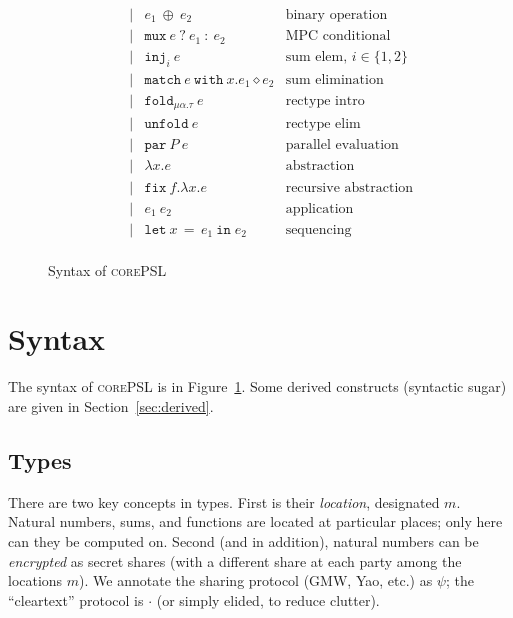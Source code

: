 \documentclass[10pt]{article}
\newcommand{\kw}[1]{\ensuremath{\mathtt{#1}}}
\newcommand{\trec}[2]{\ensuremath{\mu {#1}.{#2}}}
\newcommand{\ebinop}[2]{\ensuremath{{#1}~\oplus~{#2}}}
\newcommand{\elet}[3]{\ensuremath{\kw{let}~#1\, =\, #2~\kw{in}\;{#3}}}
\newcommand{\epar}[2]{\ensuremath{\kw{par}~{#1}~{#2}}}
\newcommand{\econd}[3]{\ensuremath{\kw{match}~{#1}~\kw{with}~x.{#2} \diamond {#3}}}
\newcommand{\emux}[3]{\ensuremath{\kw{mux}~{#1}~\kw{?}~{#2}~\kw{:}~{#3}}}
\newcommand{\einj}[2]{\ensuremath{\kw{inj}_{#1}~{#2}}}
\newcommand{\elam}[2]{\ensuremath{\lambda {#1}.{#2}}}
\newcommand{\eapp}[2]{\ensuremath{{#1}~{#2}}}
\newcommand{\efix}[3]{\ensuremath{\kw{fix}~{#1}.\elam{#2}{#3}}}
\newcommand{\efold}[2]{\ensuremath{\kw{fold}_{#1}~{#2}}}
\newcommand{\eunfold}[1]{\ensuremath{\kw{unfold}~{#1}}}
\newcommand{\lang}{\textsc{corePSL}\xspace}
\begin{document}
\begin{figure}[h]
\[\begin{array}{rlcll}
                       && \mid & \ebinop{e_1}{e_2}  & \text{binary operation} \\
                       && \mid & \emux{e}{e_1}{e_2}  & \text{MPC conditional} \\
                       && \mid & \einj{i}{e} & \text{sum elem, }i \in \{1,2\}\\
                       && \mid & \econd{e}{e_1}{e_2}  & \text{sum elimination} \\
                       && \mid & \efold{\trec{\alpha}{\tau}}{e} & \text{rectype intro}\\
                       && \mid & \eunfold{e} & \text{rectype elim}\\
                       && \mid & \epar{P}{e} & \text{parallel evaluation}\\
                       && \mid & \elam{x}{e}  & \text{abstraction} \\
                       && \mid & \efix{f}{x}{e} & \text{recursive abstraction} \\
                       && \mid & \eapp{e_1}{e_2}  & \text{application} \\
                       && \mid & \elet{x}{e_1}{e_2}  & \text{sequencing} \\
  \end{array}
  \]
  \caption{Syntax of \lang}
  \label{fig:syntax}
\end{figure}

\newpage

\section{Syntax}
\label{sec:syntax}

The syntax of \lang is in Figure~\ref{fig:syntax}. Some derived
constructs (syntactic sugar) are given in Section~\ref{sec:derived}.

\subsection{Types}

There are two key concepts in types. First is their \emph{location},
designated $m$. Natural numbers, sums, and functions are located at
particular places; only here can they be computed on. Second (and in
addition), natural numbers can be \emph{encrypted} as secret
shares (with a different share at each party among the locations
$m$). We annotate the sharing protocol (GMW, Yao, etc.) as $\psi$; the
``cleartext'' protocol is $\cdot$ (or simply elided, to reduce
clutter).
\end{document}
